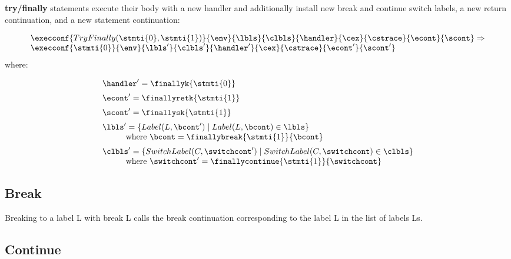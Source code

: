 \documentclass{article}
\begin{document}
\noindent
\textbf{try/finally} statements execute their body with a new handler and additionally install new break and continue switch labels, a new return continuation, and a new statement continuation:

\[
  \begin{array}{lcl}
	\execconf{TryFinally(\stmti{0}, \stmti{1})}{\env}{\lbls}{\clbls}{\handler}{\cex}{\cstrace}{\econt}{\scont}
	\Rightarrow\\
	\execconf{\stmti{0}}{\env}{\lbls'}{\clbls'}{\handler'}{\cex}{\cstrace}{\econt'}{\scont'}
	  \end{array}
\]
where:

\[
  \begin{array}{lcl}
	\handler' = \finallyk{\stmti{0}}\hspace{50mm}\\[2mm]

	\econt' = \finallyretk{\stmti{1}}\\[2mm]

	\scont' = \finallysk{\stmti{1}}\\[2mm]

	\lbls' = \lbrace Label(L, \bcont') \mid Label(L, \bcont) \in \lbls\rbrace \\
	\hspace{10mm}\textrm{where } \bcont = \finallybreak{\stmti{1}}{\bcont}\\[2mm]
	\clbls' =  \lbrace SwitchLabel(C, \switchcont') \mid SwitchLabel(C, \switchcont) \in \clbls\rbrace\\
	\hspace{10mm}\textrm{where } \switchcont' = \finallycontinue{\stmti{1}}{\switchcont}

  \end{array}
\]
\subsection{Break}
Breaking to a label L with break L calls the break continuation corresponding to the label L in the list of labels Ls.

\subsection{Continue}
\end{document}
